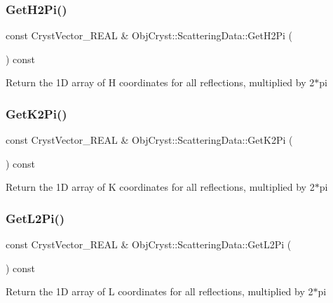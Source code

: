 \subsubsection{\texorpdfstring{GetH2Pi()}{GetH2Pi()}}
{\footnotesize\ttfamily const Cryst\+Vector\+\_\+\+R\+E\+AL \& Obj\+Cryst\+::\+Scattering\+Data\+::\+Get\+H2\+Pi (\begin{DoxyParamCaption}{ }\end{DoxyParamCaption}) const}

Return the 1D array of H coordinates for all reflections, multiplied by 2$\ast$pi \mbox{\label{class_obj_cryst_1_1_scattering_data_afa7ef198a6e1caeedcc52c2579685dfc}} 
\subsubsection{\texorpdfstring{GetK2Pi()}{GetK2Pi()}}
{\footnotesize\ttfamily const Cryst\+Vector\+\_\+\+R\+E\+AL \& Obj\+Cryst\+::\+Scattering\+Data\+::\+Get\+K2\+Pi (\begin{DoxyParamCaption}{ }\end{DoxyParamCaption}) const}

Return the 1D array of K coordinates for all reflections, multiplied by 2$\ast$pi \mbox{\label{class_obj_cryst_1_1_scattering_data_a4838871273f014329e9ef55ef088fde4}} 
\subsubsection{\texorpdfstring{GetL2Pi()}{GetL2Pi()}}
{\footnotesize\ttfamily const Cryst\+Vector\+\_\+\+R\+E\+AL \& Obj\+Cryst\+::\+Scattering\+Data\+::\+Get\+L2\+Pi (\begin{DoxyParamCaption}{ }\end{DoxyParamCaption}) const}

Return the 1D array of L coordinates for all reflections, multiplied by 2$\ast$pi \mbox{\label{class_obj_cryst_1_1_scattering_data_aeceded13328adf88e001b08ce1abed7f}} 
